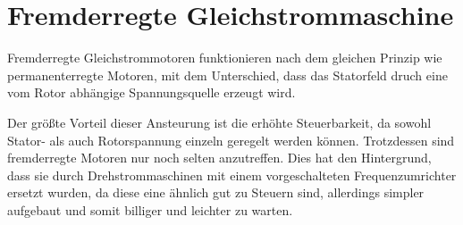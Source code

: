 \section{Fremderregte Gleichstrommaschine}
\label{fremd}

Fremderregte Gleichstrommotoren funktionieren nach dem gleichen Prinzip wie permanenterregte Motoren, mit dem Unterschied, dass das Statorfeld druch eine vom Rotor abhängige Spannungsquelle erzeugt wird.

Der größte Vorteil dieser Ansteurung ist die erhöhte Steuerbarkeit, da sowohl Stator- als auch Rotorspannung einzeln geregelt werden können.
Trotzdessen sind fremderregte Motoren nur noch selten anzutreffen.
Dies hat den Hintergrund, dass sie durch Drehstrommaschinen mit einem vorgeschalteten Frequenzumrichter ersetzt wurden, da diese eine ähnlich gut zu Steuern sind, allerdings simpler aufgebaut und somit billiger und leichter zu warten.

\cite{dcdewiki:208635995}
